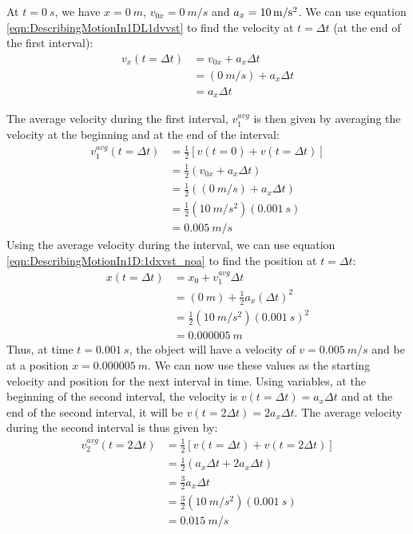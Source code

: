 At $t=\SI{0}{s}$, we have $x=\SI{0}{m}$, $v_{0x}=\SI{0}{m/s}$ and $a_x=\SI{10}{m/s\squared}$. We can use equation \ref{eqn:DescribingMotionIn1DL1dvvst} to find the velocity at $t=\Delta t$ (at the end of the first interval):
\begin{align*}
v_x(t=\Delta t) &= v_{0x} + a_x\Delta t\\
&=(\SI{0}{m/s})+ a_x\Delta t\\&=a_x\Delta t
\end{align*}

The average velocity during the first interval, $v_1^{avg}$ is then given by averaging the velocity at the beginning and at the end of the interval:
\begin{align*}
v_1^{avg}(t=\Delta t)&=\frac{1}{2}\left[ v(t=0) + v(t=\Delta t)\right]\\
&=\frac{1}{2}\left(v_{0x}+a_x\Delta t\right)\\
&=\frac{1}{2}\left((\SI{0}{m/s})+a_x\Delta t\right)\\
&=\frac{1}{2}(\SI{10}{m/s^2})(\SI{0.001}{s})\\
&=\SI{0.005}{m/s}
\end{align*}
Using the average velocity during the interval, we can use equation \ref{eqn:DescribingMotionIn1D:1dxvst_noa} to find the position at $t=\Delta t$: 
\begin{align*}
x(t=\Delta t) &= x_0 +v_1^{avg}\Delta t\\
&=(\SI{0}{m}) + \frac{1}{2}a_x(\Delta t)^2\\
&= \frac{1}{2}(\SI{10}{m/s^2})(\SI{0.001}{s})^2\\
&=\SI{0.000005}{m}
\end{align*}
Thus, at time $t=\SI{0.001}{s}$, the object will have a velocity of $v=\SI{0.005}{m/s}$ and be at a position $x=\SI{0.000005}{m}$. We can now use these values as the starting velocity and position for the next interval in time. Using variables, at the beginning of the second interval, the velocity is $v(t=\Delta t)=a_x\Delta t$ and at the end of the second interval, it will be $v(t=2\Delta t)=2a_x\Delta t$. The average velocity during the second interval is thus given by:
\begin{align*}
v_2^{avg}(t=2\Delta t)&= \frac{1}{2}\left[v(t=\Delta t)+v(t=2\Delta t) \right]\\
&=\frac{1}{2}(a_x\Delta t+2a_x\Delta t)\\
&=\frac{3}{2}a_x\Delta t\\
&=\frac{3}{2}(\SI{10}{m/s^2})(\SI{0.001}{s})\\
&=\SI{0.015}{m/s}
\end{align*}
